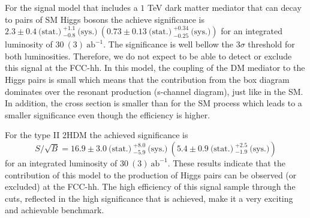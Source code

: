 For the signal model that includes a $1$ TeV dark matter mediator that can decay to pairs of SM Higgs bosons the achieve significance is $2.3\pm0.4~\text{(stat.)}~^{+1.1}_{-0.8}~\text{(sys.)}~\left(0.73\pm0.13~\text{(stat.)}~^{+0.34}_{-0.25}~\text{(sys.)}\right)$ for an integrated luminosity of $30~(3)~\text{ab}^{-1}$. The significance is well bellow the $3\sigma$ threshold for both luminosities. Therefore, we do not expect to be able to detect or exclude this signal at the FCC-hh. In this model, the coupling of the DM mediator to the Higgs pairs is small which means that the contribution from the box diagram dominates over the resonant production (s-channel diagram), just like in the SM. In addition, the cross section is smaller than for the SM process which leads to a smaller significance even though the efficiency is higher.

For the type II 2HDM the achieved significance is
\begin{equation}
	S/\sqrt{B}=16.9\pm 3.0~\text{(stat.)}~^{+8.0}_{-5.9}~\text{(sys.)}~\left(5.4\pm 0.9~\text{(stat.)}~^{+2.5}_{-1.9}~\text{(sys.)}\right)
\end{equation}
for an integrated luminosity of $30~(3)~\text{ab}^{-1}$. These results indicate that the contribution of this model to the production of Higgs pairs can be observed (or excluded) at the FCC-hh. The high efficiency of this signal sample through the cuts, reflected in the high significance that is achieved, make it a very exciting and achievable benchmark. 

